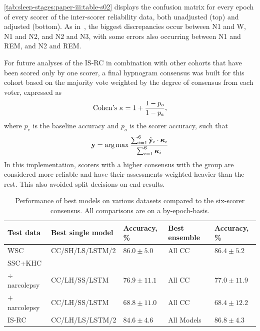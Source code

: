 \cref{tab:sleep-stages:paper-iii:table-s02} displays the confusion matrix for every epoch of every scorer of the inter-scorer reliability data, both unadjusted (top) and adjusted (bottom).
As in~\cite{Rosenberg2013}, the biggest discrepancies occur between \ac{N1} and \ac{W}, \ac{N1} and \ac{N2}, and \ac{N2} and \ac{N3}, with some errors also occurring between \ac{N1} and \ac{REM}, and \ac{N2} and \ac{REM}.

For future analyses of the \ac{IS-RC} in combination with other cohorts that have been scored only by one scorer, a final hypnogram consensus was built for this cohort based on the majority vote weighted by the degree of consensus from each voter, expressed as 
\begin{equation}
    \text{Cohen's~\ensuremath{\kappa}}= 1 + \frac{1 - p_o}{1 - p_e},
\end{equation}
where $p_e$ is the baseline accuracy and $p_o$ is the scorer accuracy, such that
\begin{equation}
    \mathbf{y} = \operatorname*{arg\,max} \frac{\sum_{i=1}^{6} \hat{\mathbf{y}}_i \cdot \boldsymbol{\kappa}_i}{\sum_{i=1}^{6} \boldsymbol{\kappa}_i}
\end{equation}
In this implementation, scorers with a higher consensus with the group are considered more reliable and have their assessments weighted heavier than the rest.
This also avoided split decisions on end-results.

\begin{table}[tb]
    \caption[\acs{STAGES} test performance]{Performance of best models on various datasets compared to the six-scorer consensus. All comparisons are on a by-epoch-basis.}
    \label{tab:sleep-stages:paper-iii:table-02}
    \small
    \begin{tabular}{@{}lllll@{}}
        \toprule
        \textbf{Test data}          & \textbf{Best single model} & \textbf{Accuracy, \%} & \textbf{Best ensemble} & \textbf{Accuracy}, \% \\ \midrule
        \ac{WSC}                & \ac{CC}/SH/LS/\ac{LSTM}/2   & $86.0 \pm 5.0$       & All \ac{CC}        & $86.4 \pm 5.2$       \\
        \ac{SSC}+\ac{KHC} & & & & \\
        \quad $\div$ narcolepsy            & \ac{CC}/LH/SS/\ac{LSTM}     & $76.9 \pm 11.1$      & All \ac{CC}        & $77.0 \pm 11.9$      \\
        \quad $+$ narcolepsy & \ac{CC}/LH/SS/\ac{LSTM}     & $68.8 \pm 11.0$      & All \ac{CC}        & $68.4 \pm 12.2$      \\
        \ac{IS-RC}              & \ac{CC}/LH/LS/\ac{LSTM}/2   & $84.6 \pm 4.6$       & All Models    & $86.8 \pm 4.3$       \\ \bottomrule
    \end{tabular}
\end{table}

